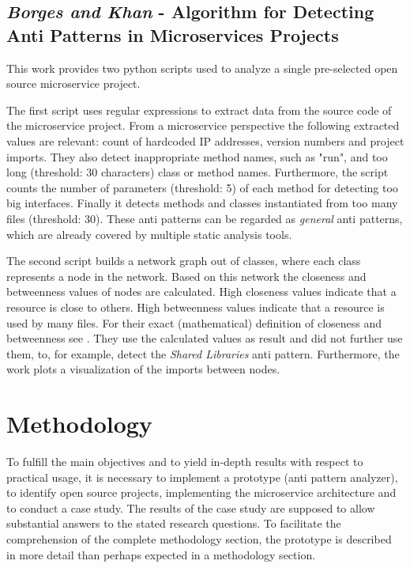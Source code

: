 \documentclass{article}
\begin{document}
\subsection{\textit{Borges and Khan} - Algorithm for Detecting Anti Patterns in Microservices Projects}
This work \cite{borges_algorithm_2019} provides two python scripts used to analyze a single pre-selected open source microservice project. \newline

The first script uses regular expressions to extract data from the source code of the microservice project. From a microservice perspective the following extracted values are relevant: count of hardcoded IP addresses, version numbers and project imports. They also detect inappropriate method names, such as "run", and too long (threshold: 30 characters) class or method names. Furthermore, the script counts the number of parameters (threshold: 5) of each method for detecting too big interfaces. Finally it detects methods and classes instantiated from too many files (threshold: 30). These anti patterns can be regarded as \textit{general} anti patterns, which are already covered by multiple static analysis tools. \newline

The second script builds a network graph out of classes, where each class represents a node in the network. Based on this network the closeness and betweenness values of nodes are calculated. High closeness values indicate that a resource is close to others. High betweenness values indicate that a resource is used by many files. For their exact (mathematical) definition of closeness and betweenness see \cite{borges_algorithm_2019}. They use the calculated values as result and did not further use them, to, for example, detect the \textit{Shared Libraries} anti pattern. Furthermore, the work plots a visualization of the imports between nodes.

\section{Methodology}
To fulfill the main objectives and to yield in-depth results with respect to practical usage, it is necessary to implement a  prototype (anti pattern analyzer), to identify open source projects, implementing the microservice architecture and to conduct a case study. The results of the case study are supposed to allow substantial answers to the stated research questions. To facilitate the comprehension of the complete methodology section, the prototype is described in more detail than perhaps expected in a methodology section.\newline
\end{document}
